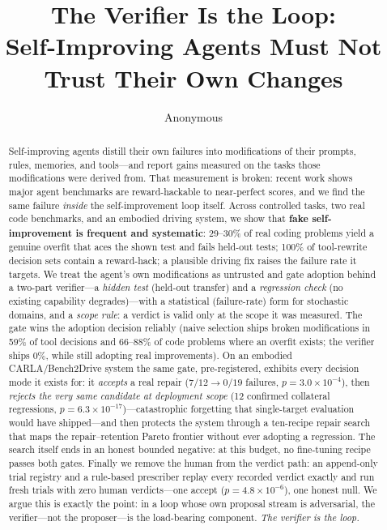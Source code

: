 \documentclass{article}
\title{The Verifier Is the Loop:\\Self-Improving Agents Must Not Trust Their Own Changes}
\author{%
  Anonymous\\
}
\begin{document}
\maketitle

\begin{abstract}
Self-improving agents distill their own failures into modifications of their prompts, rules, memories,
and tools---and report gains measured on the tasks those modifications were derived from. That
measurement is broken: recent work shows major agent benchmarks are reward-hackable to near-perfect
scores, and we find the same failure \emph{inside} the self-improvement loop itself. Across controlled
tasks, two real code benchmarks, and an embodied driving system, we show that \textbf{fake
self-improvement is frequent and systematic}: 29--30\% of real coding problems yield a genuine
overfit that aces the shown test and fails held-out tests; 100\% of tool-rewrite decision sets contain a
reward-hack; a plausible driving fix raises the failure rate it targets. We treat the agent's own
modifications as untrusted and gate adoption behind a two-part verifier---a \emph{hidden test} (held-out
transfer) and a \emph{regression check} (no existing capability degrades)---with a statistical
(failure-rate) form for stochastic domains, and a \emph{scope rule}: a verdict is valid only at the scope
it was measured. The gate wins the adoption decision reliably (naive selection ships broken modifications
in 59\% of tool decisions and 66--88\% of code problems where an overfit exists; the verifier ships
0\%, while still adopting real improvements). On an embodied CARLA/Bench2Drive system the same gate,
pre-registered, exhibits every decision mode it exists for: it \emph{accepts} a real repair
($7/12\!\to\!0/19$ failures, $p=3.0\times10^{-4}$), then \emph{rejects the very same candidate at
deployment scope} (12 confirmed collateral regressions, $p=6.3\times10^{-17}$)---catastrophic forgetting
that single-target evaluation would have shipped---and then protects the system through a ten-recipe
repair search that maps the repair--retention Pareto frontier without ever adopting a regression. The
search itself ends in an honest bounded negative: at this budget, no fine-tuning recipe passes both
gates. Finally we remove the human from the verdict path: an append-only trial registry and a rule-based
prescriber replay every recorded verdict exactly and run fresh trials with zero human verdicts---one
accept ($p=4.8\times10^{-6}$), one honest null. We argue this is exactly the point: in a loop whose own
proposal stream is adversarial, the verifier---not the proposer---is the load-bearing component.
\emph{The verifier is the loop.}
\end{abstract}
\end{document}
